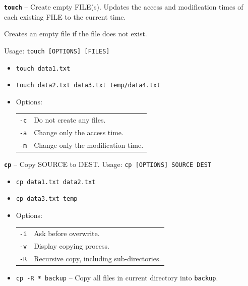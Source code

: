 \documentclass[14pt,aspectratio=1610]{beamer}
\begin{document}
\begin{frame}{\texttt{\textbf{touch}} -- Create empty FILE(s).}
  Updates the access and modification times of each existing FILE to the current time.

  Creates an empty file if the file does not exist.

Usage: \lstinline{touch [OPTIONS] [FILES]}
\begin{itemize}
  \item \lstinline{touch data1.txt}
  \item \lstinline{touch data2.txt data3.txt temp/data4.txt}
  \item Options:\\
  \begin{tabular}{l l}
    \lstinline{-c} & Do not create any files.\\
    \lstinline{-a} & Change only the access time.\\
    \lstinline{-m} & Change only the modification time.\\
  \end{tabular}
\end{itemize}
\end{frame}

\begin{frame}{\texttt{\textbf{cp}} -- Copy SOURCE to DEST.}
Usage: \lstinline{cp [OPTIONS] SOURCE DEST}

\begin{itemize}
  \item \lstinline{cp data1.txt data2.txt}
  \item \lstinline{cp data3.txt temp}

  \item Options:\\
  \begin{tabular}{l l}
    \lstinline{-i} & Ask before overwrite.\\
    \lstinline{-v} & Display copying process.\\
    \lstinline{-R} & Recursive copy, including sub-directories.\\
  \end{tabular}
  \item \lstinline{cp -R * backup} --  Copy all files in current directory into \lstinline{backup}.
\end{itemize}
\end{frame}
\end{document}
